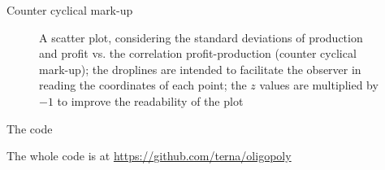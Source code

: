 \documentclass[9pt]{beamer}
\begin{document}
\begin{frame}{Counter cyclical mark-up}

\begin{figure}[H]
\begin{center}
\end{center}
\caption{A scatter plot, considering the standard deviations of production and profit vs. the correlation profit-production (counter cyclical mark-up); the droplines are intended to facilitate the observer in reading the coordinates of each point; the $z$ values are multiplied by $-1$ to improve the readability of the plot}
\label{scatter3D}
\end{figure}


\end{frame}

\begin{frame}{The code}

The whole code is at \url{https://github.com/terna/oligopoly}

\end{frame}
\end{document}

